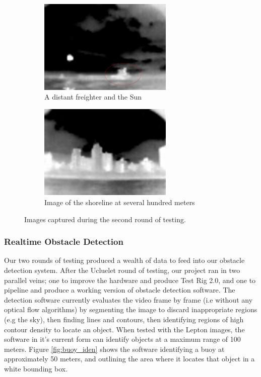 \begin{figure}
\centering
\begin{subfigure}{0.45\textwidth}
 \centering
 \includegraphics[width=0.7\textwidth]{"./image/FreighterSun_circled"}
 \caption{A distant freighter and the Sun}
 \label{fig:testround2:sub1}
\end{subfigure}
\begin{subfigure}{0.45\textwidth}
 \centering
 \includegraphics[width=0.7\textwidth]{"./image/Land"}
 \caption{Image of the shoreline at several hundred meters}
 \label{fig:testround2:sub2}
\end{subfigure}
\caption{Images captured during the second round of testing.}
\label{fig:testround2}
\end{figure}


\subsubsection{\label{sec:discussion:results:realtimeDetection}Realtime Obstacle Detection}

Our two rounds of testing produced a wealth of data to feed into our obstacle detection system. After the Ucluelet round of testing, our project ran in two parallel veins; one to improve the hardware and produce Test Rig 2.0, and one to pipeline and produce a working version of obstacle detection software. The detection software currently evaluates the video frame by frame (i.e without any optical flow algorithms) by segmenting the image to discard inappropriate regions (e.g the sky), then finding lines and contours, then identifying regions of high contour density to locate an object. When tested with the Lepton images, the software in it's current form can identify objects at a maximum range of 100 meters.  Figure \ref{fig:buoy_iden} shows the software identifying a buoy at approximately 50 meters, and outlining the area where it locates that object in a white bounding box.

